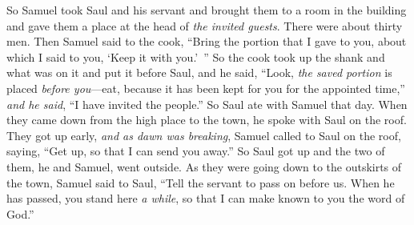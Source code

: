 \begin{biblechapter}
\verse So Samuel took Saul and his servant and brought them to a room in the building and gave them a place at the head of \textit{the invited guests}. There were about thirty men.
\verse Then Samuel said to the cook, “Bring the portion that I gave to you, about which I said to you, ‘Keep it with you.’ ”
\verse So the cook took up the shank and what was on it and put it before Saul, and he said, “Look, \textit{the saved portion} is placed \textit{before you}—eat, because it has been kept for you for the appointed time,” \textit{and he said}, “I have invited the people.” So Saul ate with Samuel that day.
\verse When they came down from the high place to the town, he spoke with Saul on the roof.
\verse They got up early, \textit{and as dawn was breaking}, Samuel called to Saul on the roof, saying, “Get up, so that I can send you away.” So Saul got up and the two of them, he and Samuel, went outside.
\verse As they were going down to the outskirts of the town, Samuel said to Saul, “Tell the servant to pass on before us. When he has passed, you stand here \textit{a while}, so that I can make known to you the word of God.”
\end{biblechapter}

